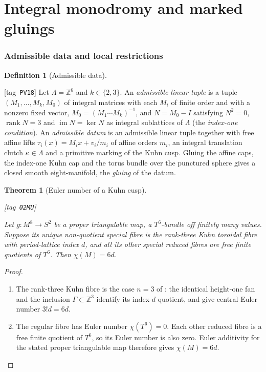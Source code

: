 \documentclass[11pt,a4paper]{article}
\numberwithin{equation}{section}
\newtheorem{theorem}{Theorem}[section]
\theoremstyle{definition}
\newtheorem{definition}[definition]{Definition}
\newcommand{\StatementRecord}[4]{{\upshape\footnotesize[tag~\texttt{#3}]}\enspace\ignorespaces}
\begin{document}
\part{Integral monodromy and marked gluings}\label{pub:V:part-classification}
\section{Admissible data and local restrictions}\label{pub:V:sec-admissible}

\begin{definition}[Admissible data]\hypertarget{tag-PV18}{}\label{def:admissible}
\StatementRecord{def:admissible}{proved}{PV18}{}
Let $\Lambda=\mathbb Z^6$ and $k\in\{2,3\}$.  An \emph{admissible linear
tuple} is a tuple $(M_1,\ldots,M_k,M_0)$ of integral matrices with each
$M_i$ of finite order and with a nonzero fixed vector,
$M_0=(M_1\cdots M_k)^{-1}$, and $N=M_0-I$ satisfying $N^2=0$,
$\operatorname{rank}N=3$ and $\operatorname{im}N=\ker N$ as integral
sublattices of $\Lambda$ (the \emph{index-one condition}).  An
\emph{admissible datum} is an admissible linear tuple together with free
affine lifts $\tau_i(x)=M_ix+v_i/m_i$ of affine orders $m_i$, an
integral translation clutch $\kappa\in\Lambda$ and a primitive marking of
the Kuhn cusp.  Gluing the affine caps, the index-one Kuhn cap and the
torus bundle over the punctured sphere gives a closed smooth
eight-manifold, the \emph{gluing} of the datum.
\end{definition}




\begin{theorem}[Euler number of a Kuhn cusp]\hypertarget{tag-02MU}{}\label{maps:src:F.1.1}
\StatementRecord{maps:src:F.1.1}{proved}{02MU}{the definitions and constructions stated in the proof}


Let $g:M^8\to S^2$ be a proper triangulable map, a $T^6$-bundle
off finitely many values.  Suppose its unique non-quotient special
fibre is the rank-three Kuhn toroidal fibre with period-lattice
index $d$, and all its other special reduced fibres are free
finite quotients of $T^6$.  Then $\chi(M)=6d$.

\end{theorem}


\begin{proof}
\begin{enumerate}[label=\arabic*.]
\item The rank-three Kuhn fibre is the case $n=3$
of \cite[Corollary~8.8, arXiv v1, p.~59]{Yang2026}: the identical
height-one fan and the inclusion $\Gamma\subset\mathbb Z^3$
identify its index-$d$ quotient, and give central Euler number
$3!d=6d$.
\item The regular fibre has Euler number $\chi(T^6)=0$.
Each other reduced fibre is a free finite quotient of $T^6$,
so its Euler number is also zero.  Euler additivity for the
stated proper triangulable map therefore gives $\chi(M)=6d$.
\end{enumerate}
\end{proof}
\end{document}
